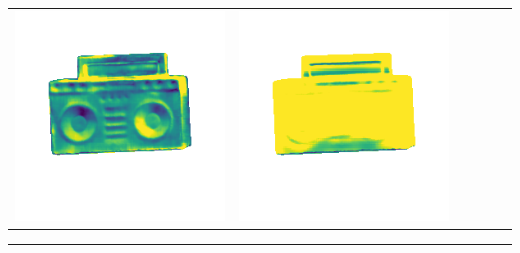 \begin{center}
\begin{tabularx}{\linewidth}{@{}Y@{}Y@{}Y@{}Y@{}Y@{}Y@{}}
\includegraphics[width=\linewidth]{semisynthetic/20160617_19_marrnet_err.png} &
\includegraphics[width=\linewidth]{semisynthetic/20160617_19_ef_err.png} \\
\end{tabularx}
\begin{center}\rule{0.5\linewidth}{\linethickness}\end{center}


\end{center}
